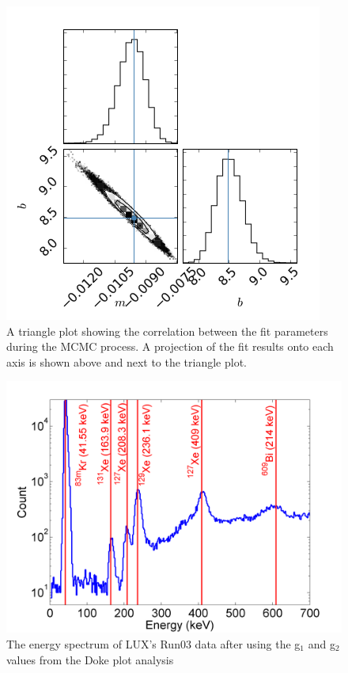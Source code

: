 \documentclass[a4paper,12pt]{article}
\begin{document}
{%
\begin{figure}[H]
\centering
\includegraphics[scale=0.5]{DokeTrianglePlot.png}
\caption{A triangle plot showing the correlation between the fit parameters during the MCMC process. A projection of the fit results onto each axis is shown above and next to the triangle plot.}
\label{Corr}
\end{figure}


\begin{figure}[H]
\centering
\includegraphics[scale=0.4]{WS_Spectrum.png}
\caption{The energy spectrum of LUX's Run03 data after using the g$_1$ and g$_2$ values from the Doke plot analysis}
\label{Run03EnergySpectrum}
\end{figure}


}
\end{document}
